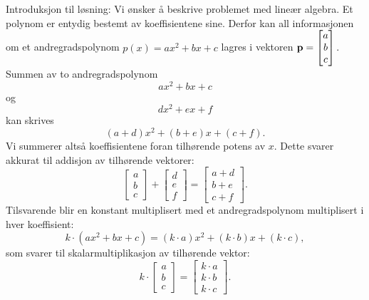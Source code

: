 \begin{losning}
Introduksjon til løsning: Vi ønsker å beskrive problemet med lineær algebra. Et polynom er entydig bestemt av koeffisientene sine. Derfor kan all informasjonen om et andregradspolynom $p(x)=ax^2+bx+c$ lagres i vektoren $\mathbf{p}=\begin{bmatrix}
a\\
b\\
c
\end{bmatrix}.$ Summen av to andregradspolynom $$ax^2+bx+c$$ og $$dx^2+ex+f$$ kan skrives $$(a+d)x^2+(b+e)x+(c+f).$$ Vi summerer altså koeffisientene foran tilhørende potens av $x$. Dette svarer akkurat til addisjon av tilhørende vektorer: $$\begin{bmatrix}
a\\
b\\
c
\end{bmatrix}+\begin{bmatrix}
d\\
e\\
f
\end{bmatrix}=\begin{bmatrix}
a+d\\
b+e\\
c+f
\end{bmatrix}.$$ Tilsvarende blir en konstant multiplisert med et andregradspolynom multiplisert i hver koeffisient: $$k\cdot(ax^2+bx+c)=(k\cdot a)x^2+(k\cdot b)x+(k\cdot c),$$ som svarer til skalarmultiplikasjon av tilhørende vektor: $$k\cdot \begin{bmatrix}
a\\
b\\
c
\end{bmatrix}=\begin{bmatrix}
k\cdot a\\
k\cdot b\\
k\cdot c
\end{bmatrix}.$$
\end{losning}
